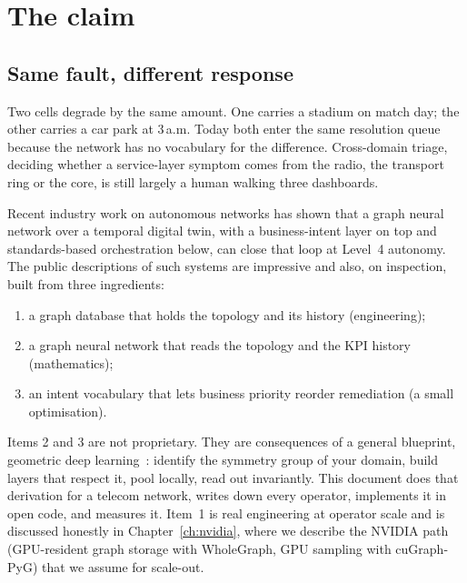 \chapter{The claim}
\label{ch:claim}

\section*{Same fault, different response}
Two cells degrade by the same amount. One carries a stadium on match day; the other carries a
car park at 3\,a.m. Today both enter the same resolution queue because the network has no
vocabulary for the difference. Cross-domain triage, deciding whether a service-layer symptom
comes from the radio, the transport ring or the core, is still largely a human walking three
dashboards.

Recent industry work on autonomous networks has shown that a graph neural network over a temporal
digital twin, with a business-intent layer on top and standards-based orchestration below, can
close that loop at Level~4 autonomy. The public descriptions of such systems are impressive and
also, on inspection, built from three ingredients:

\begin{enumerate}[nosep]
  \item a graph database that holds the topology and its history (engineering);
  \item a graph neural network that reads the topology and the KPI history (mathematics);
  \item an intent vocabulary that lets business priority reorder remediation (a small optimisation).
\end{enumerate}

Items 2 and 3 are not proprietary. They are consequences of a general blueprint, geometric deep
learning~\cite{bronstein2021}: identify the symmetry group of your domain, build layers that respect
it, pool locally, read out invariantly. This document does that derivation for a telecom network,
writes down every operator, implements it in open code, and measures it. Item~1 is real engineering
at operator scale and is discussed honestly in Chapter~\ref{ch:nvidia}, where we describe the NVIDIA
path (GPU-resident graph storage with WholeGraph, GPU sampling with cuGraph-PyG) that we assume for
scale-out.

